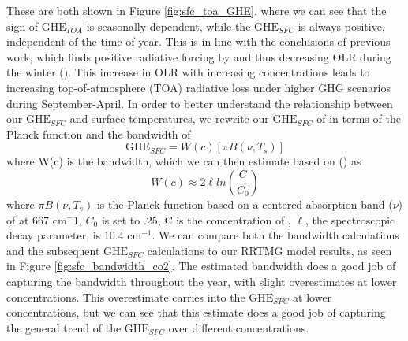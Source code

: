 \documentclass[draft]{agujournal2019}
\begin{document}
These are both shown in Figure \ref{fig:sfc_toa_GHE}, where we can see that the sign of ${\text{GHE}_{TOA}}$ is seasonally dependent, while the ${\text{GHE}_{SFC}}$ is always positive, independent of the time of year. This is in line with the conclusions of previous work, which finds positive radiative forcing by  and thus decreasing OLR during the winter (\cite{schmithusen_how_2015}). This increase in OLR with increasing  concentrations leads to increasing top-of-atmosphere (TOA) radiative loss under higher GHG scenarios during September-April. In order to better understand the relationship between our ${\text{GHE}_{SFC}}$ and surface temperatures, we rewrite our ${\text{GHE}_{SFC}}$ of  in terms of the Planck function and the bandwidth of 
\begin{equation}\label{eq:GHE_sfc}
    {\text{GHE}_{SFC}} = W(c)[\pi B(\nu,T_s)]
\end{equation}
where W(c) is the bandwidth, which we can then estimate based on (\cite{jeevanjee_analytical_2020}) as
\begin{equation}\label{eq:bandwidth}
    W(c) \approx 2\ell ln(\frac{C}{C_0})
\end{equation}
where $\pi B(\nu,T_s)$ is the Planck function based on a centered absorption band ($\nu$) of  at 667 cm$^-1$, $C_0$ is set to .25, C is the concentration of , $\ell$, the spectroscopic decay parameter, is 10.4 cm$^{-1}$. We can compare both the bandwidth calculations and the subsequent ${\text{GHE}_{SFC}}$ calculations to our RRTMG model results, as seen in Figure \ref{fig:sfc_bandwidth_co2}. The estimated bandwidth does a good job of capturing the bandwidth throughout the year, with slight overestimates at lower  concentrations. This overestimate carries into the ${\text{GHE}_{SFC}}$ at lower  concentrations, but we can see that this estimate does a good job of capturing the general trend of the ${\text{GHE}_{SFC}}$ over different  concentrations. 
\end{document}
